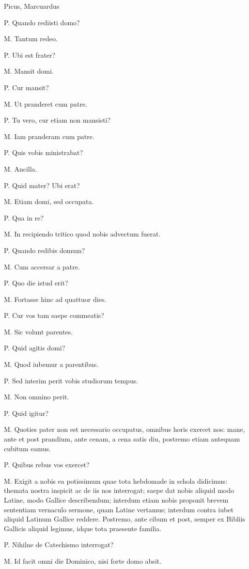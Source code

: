 \documentclass{article}
\begin{document}
Picus, Marcuardus

P. Quando rediisti domo?

M. Tantum redeo. 

P. Ubi est frater?

M. Mansit domi. 

P. Cur mansit?

M. Ut pranderet cum patre. 

P. Tu vero, cur etiam non mansisti?

M. Iam pranderam cum patre. 

P. Quis vobis ministrabat?

M. Ancilla. 

P. Quid mater? Ubi erat?

M. Etiam domi, sed occupata. 

P. Qua in re?

M. In recipiendo tritico quod nobis advectum fuerat. 

P. Quando redibis domum?

M. Cum accersar a patre. 

P. Quo die istud erit?

M. Fortasse hinc ad quattuor dies. 

P. Cur vos tam saepe commeatis?

M. Sic volunt parentes. 

P. Quid agitis domi?

M. Quod iubemur a parentibus. 

P. Sed interim perit vobis studiorum tempus. 

M. Non omnino perit. 

P. Quid igitur?

M. Quoties pater non est necessario occupatus, omnibus horis exercet nos: mane, ante et post prandium, ante cenam, a cena satis diu, postremo etiam antequam cubitum eamus. 

P. Quibus rebus vos exercet?

M. Exigit a nobis ea potissimum quae tota hebdomade in schola didicimus: themata nostra inspicit ac de iis nos interrogat; saepe dat nobis aliquid modo Latine, modo Gallice describendum; interdum etiam nobis proponit brevem sententiam vernaculo sermone, quam Latine vertamus; interdum contra iubet aliquid Latinum Gallice reddere. Postremo, ante cibum et post, semper ex Bibliis Gallicis aliquid legimus, idque tota praesente familia.

P. Nihilne de Catechismo interrogat?

M. Id facit omni die Dominico, nisi forte domo absit. 
\end{document}
